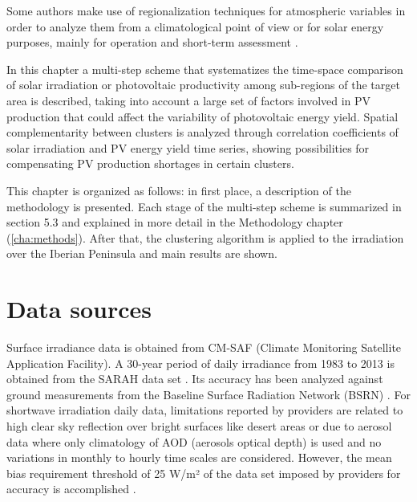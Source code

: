 Some authors make use of regionalization techniques for atmospheric variables in order to analyze them from a climatological point of view \cite*{Argueso2011} or for solar energy purposes, mainly for operation and short-term assessment \cite*{Zagouras2013, Zagouras2014, Zagouras2014b}.

In this chapter a multi-step scheme that systematizes the time-space comparison of solar irradiation or photovoltaic productivity among sub-regions of the target area is described, taking into account a large set of factors involved in PV production that could affect the variability of photovoltaic energy yield. Spatial complementarity between clusters is analyzed through correlation coefficients of solar irradiation and PV energy yield time series, showing possibilities for compensating PV production shortages in certain clusters.


This chapter is organized as follows: in first place, a description of the methodology is presented. Each stage of the multi-step scheme is summarized in section 5.3 and explained in more detail in the Methodology chapter (\ref{cha:methods}). After that, the clustering algorithm is applied to the irradiation over the Iberian Peninsula and main results are shown.

\section{Data sources}

Surface irradiance data is obtained from CM-SAF (Climate Monitoring Satellite Application Facility). A 30-year period of daily irradiance from 1983 to 2013 is obtained from the SARAH data set \cite*{Muller2015}. Its accuracy has been analyzed \cite*{Posselt2012, Muller2015} against ground measurements from the Baseline Surface Radiation Network (BSRN) \cite*{ohmura1998}. For shortwave irradiation daily data, limitations reported by providers are related to high clear sky reflection over bright surfaces like desert areas or due to aerosol data where only climatology of AOD (aerosols optical depth) is used and no variations in monthly to hourly time scales are considered. However, the mean bias requirement threshold of 25 W/m² of the data set imposed by providers for accuracy is accomplished \cite*{Posselt2012, Muller2015}. 

